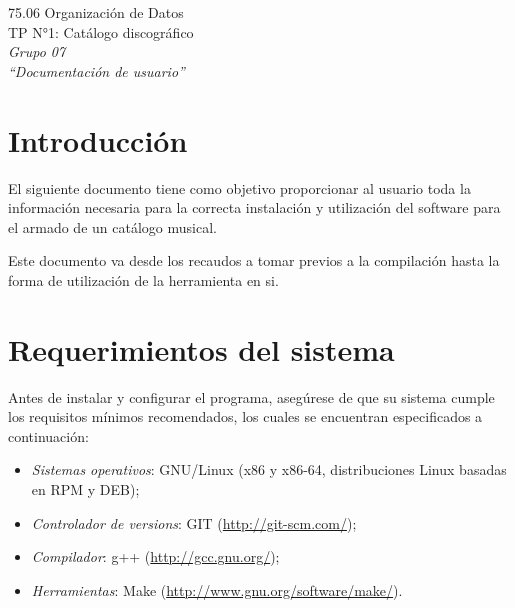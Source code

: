 \documentclass{article}
\begin{document}
\setcounter{page}{5}

\begin{titlepage}
	\vspace*{\fill}
	\begin{center}
		\Large 75.06 Organización de Datos \\
		\Huge TP N°1: Catálogo discográfico \\
		\bigskip\huge\textit{Grupo 07} \\
		\bigskip\bigskip\bigskip\bigskip\bigskip\bigskip
		\bigskip\bigskip\bigskip\bigskip\bigskip\bigskip\bigskip
		\medskip\huge\textit{``Documentación de usuario''} \\
		\date{}
	\end{center}
	\vspace*{\fill}
\end{titlepage}
\newpage



\tableofcontents
\newpage
{}




\section{Introducción}
	
	El siguiente documento tiene como objetivo proporcionar al usuario toda la información necesaria para la correcta instalación y utilización del software para el armado de un catálogo musical.
	\par
	Este documento va desde los recaudos a tomar previos a la compilación hasta la forma de utilización de la herramienta en si.
\bigskip




\section{Requerimientos del sistema}

	Antes de instalar y configurar el programa, asegúrese de que su sistema cumple los requisitos mínimos recomendados, los cuales se encuentran especificados a continuación:
	\medskip

\begin{itemize}
\itemsep=5pt \topsep=0pt \partopsep=0pt \parskip=0pt \parsep=0pt

	\item \textit{Sistemas operativos}: GNU/Linux (x86 y x86-64, distribuciones Linux basadas en RPM y DEB);

	\item \textit{Controlador de versions}: GIT (\url{http://git-scm.com/});

	\item \textit{Compilador}: g++ (\url{http://gcc.gnu.org/});

	\item \textit{Herramientas}: Make (\url{http://www.gnu.org/software/make/}).

\end{itemize}
\bigskip
\end{document}
